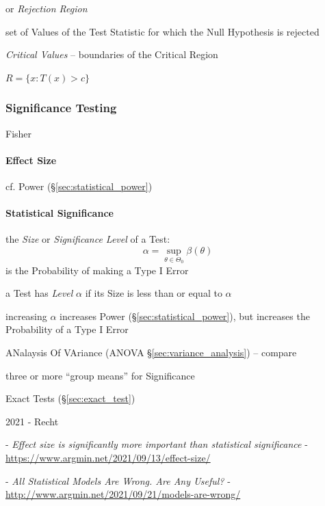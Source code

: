 or \emph{Rejection Region}

set of Values of the Test Statistic for which the Null Hypothesis is rejected

\emph{Critical Values} -- boundaries of the Critical Region

$R = \{ x : T(x) > c \}$



\subsubsection{Significance Testing}\label{sec:significance_testing}

Fisher



\paragraph{Effect Size}\label{sec:effect_size}\hfill

cf. Power (\S\ref{sec:statistical_power})



\paragraph{Statistical Significance}\label{sec:statistical_significance}\hfill

the \emph{Size} or \emph{Significance Level} of a Test:
\[
  \alpha = \sup_{\theta \in \Theta_0} \beta(\theta)
\]
is the Probability of making a Type I Error

a Test has \emph{Level} $\alpha$ if its Size is less than or equal to $\alpha$

increasing $\alpha$ increases Power (\S\ref{sec:statistical_power}), but
increases the Probability of a Type I Error

\fist ANalaysis Of VAriance (ANOVA \S\ref{sec:variance_analysis}) -- compare

three or more ``group means'' for Significance

Exact Tests (\S\ref{sec:exact_test})

2021 - Recht

- \emph{Effect size is significantly more important than statistical
significance} - \url{https://www.argmin.net/2021/09/13/effect-size/}

- \emph{All Statistical Models Are Wrong. Are Any Useful?} -
\url{http://www.argmin.net/2021/09/21/models-are-wrong/}



